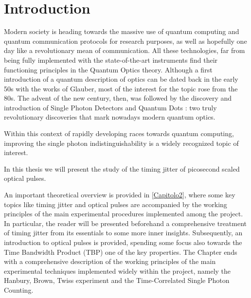 \chapter{Introduction}

\begin{comment}
Motivations and guide to the general structure of the thesis among the different chapters !

Motivazioni : Quello di cui voglio parlare è inerente al contesto di sempre maggiore interesse al giorno d'oggi delle tecnologie sviluppate sulla base dei principi della quantum optics. 
A questo punto l'idea sarebbe quella di fare una breve picture storica, volta alla trasmissione al lettore del concetto secondo cui tutto questo ambito di ricerca sia estrememente recente e sebbene le prime avvisaglie sono state nei primi anni '50 con Glauber e HBT, il grosso arriva solo dagli anni 70-90.
Il tutto conduce all'inizio del nuovo secolo quando con l'avvento degli SNSPD e la teorizzazione e creazione dei primi QD si è iniziato a parlare di "Modern Quantum Optics".

La conclusione di questa parte di motivazioni io la farei andando ad introdurre il concetto del perfezionare la qualità della luce a singolo fotone che siamo in grado di produrre.    
\end{comment}

Modern society is heading towards the massive use of quantum computing and quantum communication protocols for research purposes, as well as hopefully one day like a revolutionary mean of communication.
All these technologies, far from being fully implemented with the state-of-the-art instruments find their functioning principles in the Quantum Optics theory. 
Although a first introduction of a quantum description of optics can be dated back in the early 50s with the works of Glauber, most of the interest for the topic rose from the 80s. The advent of the new century, then, was followed by the discovery and introduction of Single Photon Detectors and Quantum Dots : two truly revolutionary discoveries that mark nowadays modern quantum optics.

Within this context of rapidly developing races towards quantum computing, improving the single photon indistinguishability is a widely recognized topic of interest.

In this thesis we will present the study of the timing jitter of picosecond scaled optical pulses.

An important theoretical overview is provided in \autoref{Capitolo2}, where some key topics like timing jitter and optical pulses are accompanied by the working principles of the main experimental procedures implemented among the project.
In particular, the reader will be presented beforehand a comprehensive treatment of timing jitter from its essentials to some more inner insights.
Subsequently, an introduction to optical pulses is provided, spending some focus also towards the Time Bandwidth Product (TBP) one of the key properties.
The Chapter ends with a comprehensive description of the working principles of the main experimental techniques implemented widely within the project, namely the Hanbury, Brown, Twiss experiment and the Time-Correlated Single Photon Counting.

